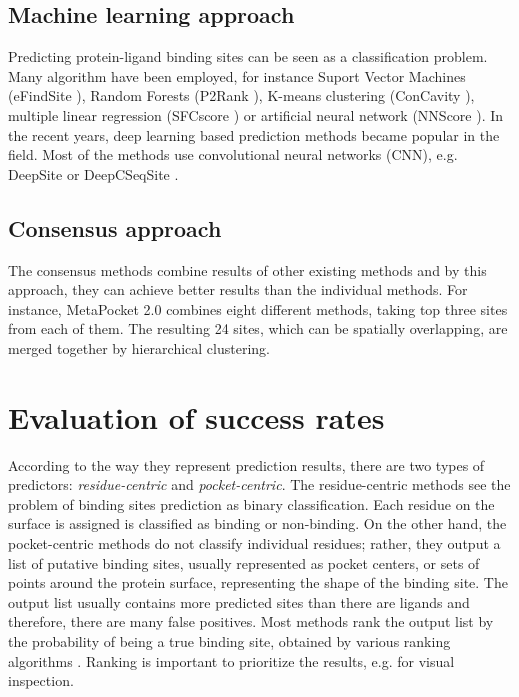 \subsection{Machine learning approach}
Predicting protein-ligand binding sites can be seen as a classification problem. Many algorithm have been employed, for instance Suport Vector Machines (eFindSite \cite{efindsite}), Random Forests (P2Rank \cite{p2rank1}), K-means clustering (ConCavity \cite{concavity}), multiple linear regression (SFCscore \cite{sfcscore}) or artificial neural network (NNScore \cite{nnscore}). In the recent years, deep learning based prediction methods became popular in the field. Most of the methods use convolutional neural networks (CNN), e.g. DeepSite \cite{deepsite} or DeepCSeqSite \cite{deepcseqsite}.

\subsection{Consensus approach}
The consensus methods combine results of other existing methods and by this approach, they can achieve better results than the individual methods. For instance, MetaPocket 2.0 \cite{metapocket} combines eight different methods, taking top three sites from each of them. The resulting 24 sites, which can be spatially overlapping, are merged together by hierarchical clustering.


\section{Evaluation of success rates}

According to the way they represent prediction results, there are two types of predictors: \textit{residue-centric} and \textit{pocket-centric}. The residue-centric methods see the problem of binding sites prediction as binary classification. Each residue on the surface is assigned is classified as binding or non-binding. On the other hand, the pocket-centric methods do not classify individual residues; rather, they output a list of putative binding sites, usually represented as pocket centers, or sets of points around the protein surface, representing the shape of the binding site. The output list usually contains more predicted sites than there are ligands and therefore, there are many false positives. Most methods rank the output list by the probability of being a true binding site, obtained by various ranking algorithms \cite{p2rank1}. Ranking is important to prioritize the results, e.g. for visual inspection.

